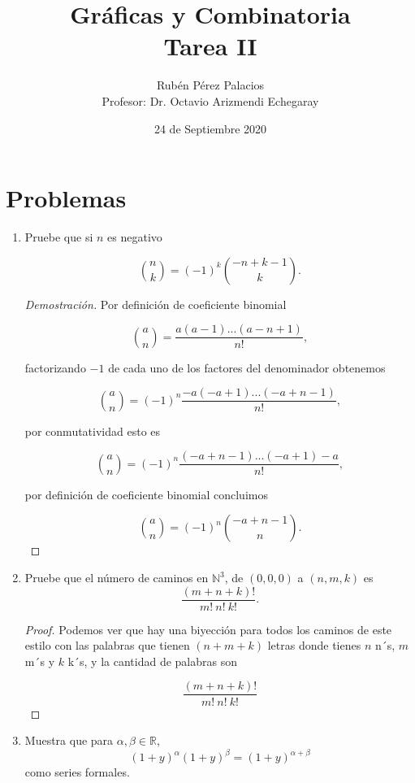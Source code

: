 \documentclass[letterpaper]{article}
\title{Gráficas y Combinatoria\\Tarea II}
\author{Rubén Pérez Palacios\\Profesor: Dr. Octavio Arizmendi Echegaray}
\date{24 de Septiembre 2020}
\newcommand{\1}{\mathbbm{1}}
\begin{document}
	\maketitle
    
    \section*{Problemas}

    \begin{enumerate}
		
		\item Pruebe que si $n$ es negativo 

		\[\binom{n}{k}=(-1)^k\binom{-n+k-1}{k}.\]

		\begin{proof}[Demostración]
        
			Por definición de coeficiente binomial
			
			\[\binom{a}{n} = \frac{a(a-1)...(a-n+1)}{n!},\]
			
			factorizando $-1$ de cada uno de los factores del denominador obtenemos
			
			\[\binom{a}{n} = (-1)^n\frac{-a(-a+1)...(-a+n-1)}{n!},\]
			
			por conmutatividad esto es
			
			\[\binom{a}{n} = (-1)^n\frac{(-a+n-1)...(-a+1)-a}{n!},\]
			
			por definición de coeficiente binomial concluimos
			
			\[\binom{a}{n} = (-1)^n\binom{-a+n-1}{n}.\]
			
		\end{proof}

        \item Pruebe que el n\'umero de caminos en $\mathbb{N}^3$, de $(0,0,0)$ a $(n,m,k)$ es
		\[\frac{(m+n+k)!}{m! \ n! \ k!}.\]

		\begin{proof}
			Podemos ver que hay una biyección para todos los caminos de este estilo con las palabras que tienen $(n+m+k)$ letras donde tienes $n$ n´s, $m$ m´s y $k$ k´s, y la cantidad de palabras son

			\[\frac{(m+n+k)!}{m! \ n! \ k!}\]

		\end{proof}

		\item Muestra que para $\alpha, \beta\in \mathbb{R}$,
		$$(1+y)^\alpha(1+y)^\beta=(1+y)^{\alpha+\beta}$$
		como series formales.


\end{enumerate}
\end{document}
